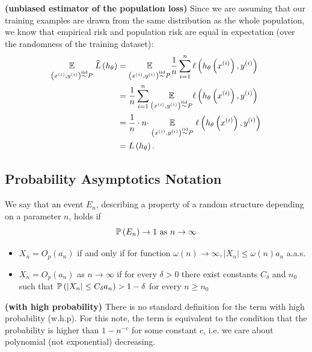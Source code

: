\documentclass{article}
\newcommand{\bfs}[1]{\textbf{({#1}) }}
\begin{document}
\begin{rema}\bfs{unbiased estimator of the population loss}
Since we are assuming that our training examples are drawn from the same distribution as the whole population, we know that empirical risk and population risk are equal in expectation (over the randomness of the training dataset):
\begin{align*}
 \begin{aligned}
\underset{\left(x^{(i)}, y^{(i)}\right) \stackrel{\mathrm{iid}}{\sim} P}{\E} \widehat{L}\left(h_{\theta}\right) &=\underset{\left(x^{(i)}, y^{(i)}\right) \stackrel{\mathrm{iid}}{\sim} P}{\mathbb{E}} \frac{1}{n}\sum_{i=1}^{n} \ell\left(h_{\theta}\left(x^{(i)}\right), y^{(i)}\right) \\
&=\frac{1}{n} \sum_{i=1}^{n} \underset{\left(x^{(i)}, y^{(i)}\right) \stackrel{\mathrm{iid}}{\sim} P}{\mathbb{E}}  \ell\left(h_{\theta}\left(x^{(i)}\right), y^{(i)}\right) \\
&=\frac{1}{n} \cdot n \cdot \underset{\left(x^{(i)}, y^{(i)}\right) \stackrel{\mathrm{iid}}{\sim} P}{\E}\ell\left(h_{\theta}\left(x^{(i)}\right), y^{(i)}\right) \\
&=L\left(h_{\theta}\right) .
\end{aligned}
\end{align*}
\end{rema}

\subsection{Probability Asymptotics Notation}
 We say that an event $E _{n}$, describing a property of a random structure depending on a parameter $n$, holds  if $$\P \left( E _{n}\right) \rightarrow 1 \text{ as } n \rightarrow \infty$$
 \begin{itemize}
     \item $X_{n}=O_{p}\left(a_{n}\right)$ if and only if for 
     function $\omega(n) \rightarrow \infty,\left|X_{n}\right| \leq \omega(n) a_{n}$ a.a.s.
    \item 
     $X_{n}=O_{p}\left(a_{n}\right)$ as $n \rightarrow \infty$ if for every $\delta>0$ there exist constants $C_{\delta}$ and $n_{0}$ such that $\P \left(\left|X_{n}\right| \leq C_{\delta} a_{n}\right)>1-\delta$ for every $n \geq n_{0}$
 \end{itemize}
 \begin{rema}\bfs{with high probability}
There is no standard definition for the term with high probability (w.h.p). For this note, the term is equivalent to the condition that the probability is higher than $1-n^{-c}$ for some constant $c$, i.e. we care about polynomial (not exponential) decreasing.
 \end{rema} 
 
\end{document}

